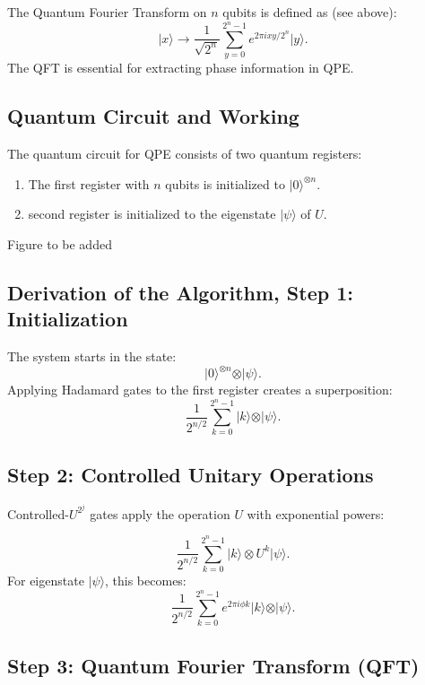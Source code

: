 \documentclass[%
oneside,                 %
final,                   %
10pt]{article}
\begin{document}
The Quantum Fourier Transform on $n$ qubits is defined as (see above):
\[
    \vert x\rangle \rightarrow \frac{1}{\sqrt{2^n}}\sum_{y=0}^{2^n-1} e^{2\pi i xy / 2^n}\vert y\rangle.
\]
The QFT is essential for extracting phase information in QPE.

\subsection{Quantum Circuit and Working}

The quantum circuit for QPE consists of two quantum registers:
\begin{enumerate}
\item The first register with $n$ qubits is initialized to $\vert 0\rangle^{\otimes n}$.

\item second register is initialized to the eigenstate $\vert\psi\rangle$ of $U$.
\end{enumerate}

\noindent
Figure to be added

\subsection{Derivation of the Algorithm, Step 1: Initialization}
\begin{block}{}
The system starts in the state:
\[
\vert 0 \rangle ^{\otimes n} \otimes \vert\psi\rangle .
\]
Applying Hadamard gates to the first register creates a superposition:
\[
    \frac{1}{2^{n/2}}\sum_{k=0}^{2^n -1} \vert k \rangle \otimes \vert\psi\rangle .
\]
\end{block}
\subsection{Step 2: Controlled Unitary Operations}
Controlled-$U^{2^j}$ gates apply the operation $U$ with exponential powers:
\begin{block}{}
\[
    \frac{1}{2^{n/2}}\sum_{k=0}^{2^n -1} \vert k \rangle  \otimes U^k\vert\psi\rangle .
\]
For eigenstate $\vert\psi\rangle $, this becomes:
\[
    \frac{1}{2^{n/2}}\sum_{k=0}^{2^n -1} e^{2\pi i \phi k}\vert k \rangle  \otimes \vert\psi\rangle .
\]
\end{block}

\subsection{Step 3: Quantum Fourier Transform (QFT)}
\end{document}
